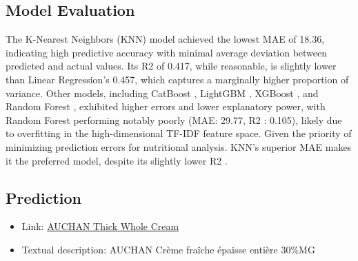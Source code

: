 \subsection{Model Evaluation}
The K-Nearest Neighbors (KNN) model achieved the lowest MAE of 18.36, indicating high predictive accuracy with minimal average deviation between predicted and actual values. Its R2 of 0.417, while reasonable, is slightly lower than Linear Regression’s 0.457, which captures a marginally higher
proportion of variance.
Other models, including CatBoost , LightGBM , XGBoost , and Random
Forest , exhibited higher errors and lower explanatory power, with Random
Forest performing notably poorly (MAE: 29.77, R2 : 0.105), likely due to
overfitting in the high-dimensional TF-IDF feature space. Given the priority
of minimizing prediction errors for nutritional analysis. KNN’s superior MAE
makes it the preferred model, despite its slightly lower R2 .
\subsection{Prediction}
\begin{itemize}
    \small
    \item Link: \href{https://www.auchan.fr/auchan-creme-fraiche-epaisse-entiere-30-mg/pr-C1177977}{AUCHAN Thick Whole Cream}
    \item Textual description: AUCHAN Crème fraîche épaisse entière 30\%MG
\end{itemize}
\begin{table}[H]
    \centering
    \caption{Nutritional prediction}
\end{table}

